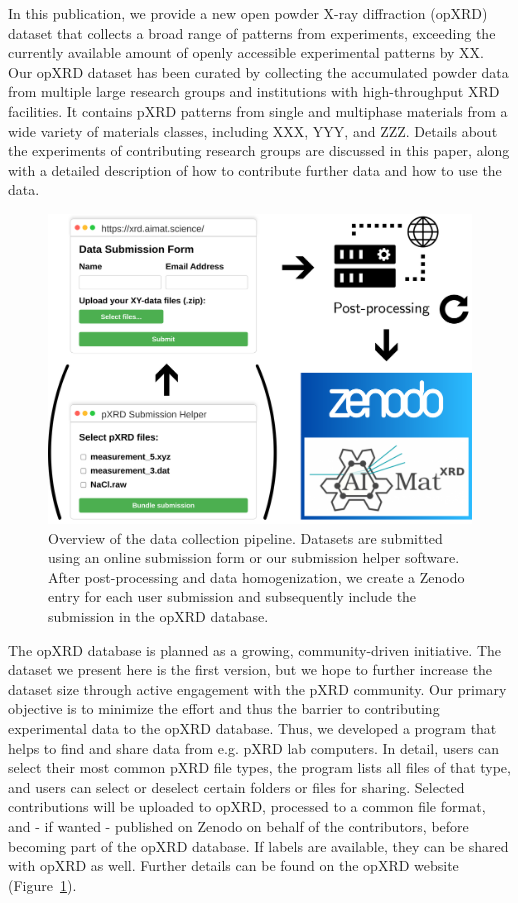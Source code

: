 In this publication, we provide a new open powder X-ray diffraction (opXRD) dataset that collects a broad range of patterns from experiments, exceeding the currently available amount of openly accessible experimental patterns by XX.
Our opXRD dataset has been curated by collecting the accumulated powder data from multiple large research groups and institutions with high-throughput XRD facilities. It contains pXRD patterns from single and multiphase materials from a wide variety of materials classes, including XXX, YYY, and ZZZ. Details about the experiments of contributing research groups are discussed in this paper, along with a detailed description of how to contribute further data and how to use the data. \\

\begin{figure}[!htb]
    \centering
    \includegraphics[width=\linewidth]{figures/overview2.png}
    \caption{Overview of the data collection pipeline. Datasets are submitted using an online submission form or our submission helper software. After post-processing and data homogenization, we create a Zenodo entry for each user submission and subsequently include the submission in the opXRD database.}
    \label{fig:overview}
\end{figure}

The opXRD database is planned as a growing, community-driven initiative. The dataset we present here is the first version, but we hope to further increase the dataset size through active engagement with the pXRD community. Our primary objective is to minimize the effort and thus the barrier to contributing experimental data to the opXRD database. Thus, we developed a program that helps to find and share data from e.g. pXRD lab computers. In detail, users can select their most common pXRD file types, the program lists all files of that type, and users can select or deselect certain folders or files for sharing. Selected contributions will be uploaded to opXRD, processed to a common file format, and - if wanted - published on Zenodo on behalf of the contributors, before becoming part of the opXRD database. If labels are available, they can be shared with opXRD as well. Further details can be found on the opXRD website (Figure~\ref{fig:overview}).

